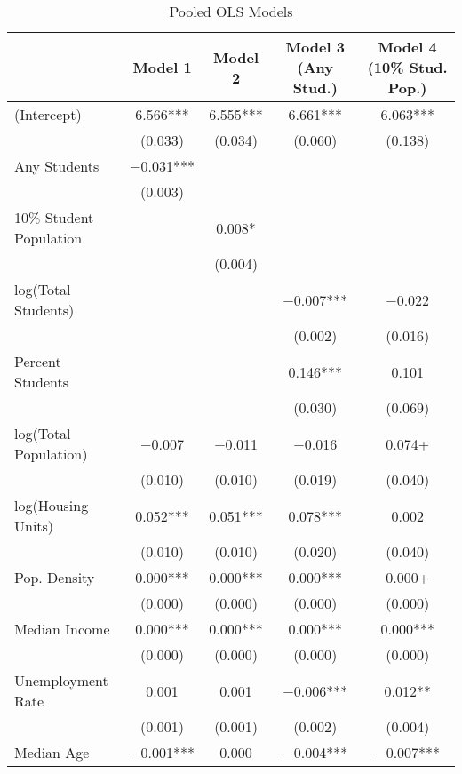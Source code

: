 \documentclass[12pt,english]{article}
\begin{document}
\begin{table*}[p]
\begin{adjustwidth}{-1in}{-1in} %
\caption{Pooled OLS Models}
\label{tab:olsmodels}
\centering
\begin{tabular}{lcccc}
\toprule
  & Model 1 & Model 2 & Model 3 (Any Stud.) & Model 4 (10\% Stud. Pop.)\\
\midrule
(Intercept) & \num{6.566}*** & \num{6.555}*** & \num{6.661}*** & \num{6.063}***\\
 & (\num{0.033}) & (\num{0.034}) & (\num{0.060}) & (\num{0.138})\\
Any Students & \num{-0.031}*** &  &  & \\
 & (\num{0.003}) &  &  & \\
10\% Student Population &  & \num{0.008}* &  & \\
 &  & (\num{0.004}) &  & \\
log(Total Students) &  &  & \num{-0.007}*** & \num{-0.022}\\
 &  &  & (\num{0.002}) & (\num{0.016})\\
Percent Students &  &  & \num{0.146}*** & \num{0.101}\\
 &  &  & (\num{0.030}) & (\num{0.069})\\
log(Total Population) & \num{-0.007} & \num{-0.011} & \num{-0.016} & \num{0.074}+\\
 & (\num{0.010}) & (\num{0.010}) & (\num{0.019}) & (\num{0.040})\\
log(Housing Units) & \num{0.052}*** & \num{0.051}*** & \num{0.078}*** & \num{0.002}\\
 & (\num{0.010}) & (\num{0.010}) & (\num{0.020}) & (\num{0.040})\\
Pop. Density & \num{0.000}*** & \num{0.000}*** & \num{0.000}*** & \num{0.000}+\\
 & (\num{0.000}) & (\num{0.000}) & (\num{0.000}) & \vphantom{2} (\num{0.000})\\
Median Income & \num{0.000}*** & \num{0.000}*** & \num{0.000}*** & \num{0.000}***\\
 & (\num{0.000}) & (\num{0.000}) & (\num{0.000}) & \vphantom{1} (\num{0.000})\\
Unemployment Rate & \num{0.001} & \num{0.001} & \num{-0.006}*** & \num{0.012}**\\
 & (\num{0.001}) & (\num{0.001}) & (\num{0.002}) & (\num{0.004})\\
Median Age & \num{-0.001}*** & \num{0.000} & \num{-0.004}*** & \num{-0.007}***\\

\end{tabular}
\end{adjustwidth}
\end{table*}
\end{document}
